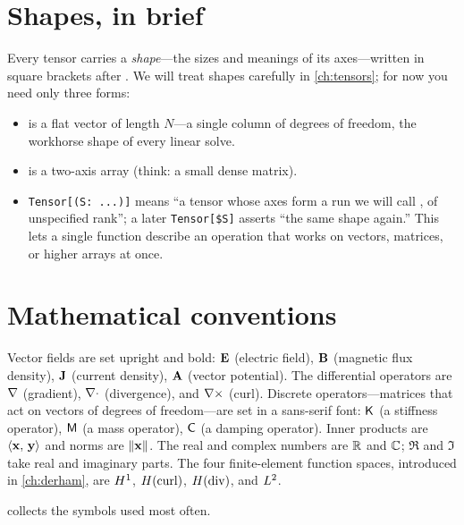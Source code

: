 \section*{Shapes, in brief}

Every tensor carries a \emph{shape}---the sizes and meanings of its axes---written
in square brackets after . We will treat shapes carefully in
\cref{ch:tensors}; for now you need only three forms:

\begin{itemize}[nosep]
  \item {} is a flat vector of length $N$---a single column of
  degrees of freedom, the workhorse shape of every linear solve.
  \item {} is a two-axis array (think: a small dense matrix).
  \item \lstinline[style=l4style]|Tensor[(S: ...)]| means ``a tensor whose axes
  form a run we will call , of unspecified rank''; a later
  \lstinline[style=l4style]|Tensor[$S]| asserts ``the same shape 
  again.'' This lets a single function describe an operation that works on
  vectors, matrices, or higher arrays at once.
\end{itemize}

\section*{Mathematical conventions}

Vector fields are set upright and bold: $\mathbf{E}$ (electric field), $\mathbf{B}$ (magnetic
flux density), $\mathbf{J}$ (current density), $\mathbf{A}$ (vector potential). The
differential operators are $\nabla$ (gradient), $\nabla\cdot$ (divergence), and
$\nabla\times$ (curl). Discrete operators---matrices that act on vectors of degrees of
freedom---are set in a sans-serif font: $\mathsf{K}$ (a stiffness operator),
$\mathsf{M}$ (a mass operator), $\mathsf{C}$ (a damping operator). Inner products are
$\left\langle \mathbf{x},\, \mathbf{y}\right\rangle$ and norms are $\lVert\mathbf{x}\rVert$. The real and complex numbers are
$\mathbb{R}$ and $\mathbb{C}$; $\Re$ and $\Im$ take real and imaginary parts. The four
finite-element function spaces, introduced in \cref{ch:derham}, are $H^1$,
$H(\mathrm{curl})$, $H(\mathrm{div})$, and $L^2$.

 collects the symbols used most often.

